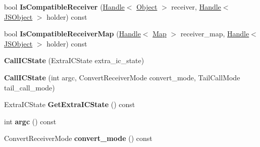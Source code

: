 \begin{DoxyCompactItemize}
\item 
bool {\bfseries Is\+Compatible\+Receiver} (\hyperlink{classv8_1_1internal_1_1_handle}{Handle}$<$ \hyperlink{classv8_1_1internal_1_1_object}{Object} $>$ receiver, \hyperlink{classv8_1_1internal_1_1_handle}{Handle}$<$ \hyperlink{classv8_1_1internal_1_1_j_s_object}{J\+S\+Object} $>$ holder) const \hypertarget{classv8_1_1internal_1_1_b_a_s_e___e_m_b_e_d_d_e_d_a04e22989931ae1087959c22e1a6d11ae}{}\label{classv8_1_1internal_1_1_b_a_s_e___e_m_b_e_d_d_e_d_a04e22989931ae1087959c22e1a6d11ae}

\item 
bool {\bfseries Is\+Compatible\+Receiver\+Map} (\hyperlink{classv8_1_1internal_1_1_handle}{Handle}$<$ \hyperlink{classv8_1_1internal_1_1_map}{Map} $>$ receiver\+\_\+map, \hyperlink{classv8_1_1internal_1_1_handle}{Handle}$<$ \hyperlink{classv8_1_1internal_1_1_j_s_object}{J\+S\+Object} $>$ holder) const \hypertarget{classv8_1_1internal_1_1_b_a_s_e___e_m_b_e_d_d_e_d_af868822b7aad2bef99a9010ce94ece2b}{}\label{classv8_1_1internal_1_1_b_a_s_e___e_m_b_e_d_d_e_d_af868822b7aad2bef99a9010ce94ece2b}

\item 
{\bfseries Call\+I\+C\+State} (Extra\+I\+C\+State extra\+\_\+ic\+\_\+state)\hypertarget{classv8_1_1internal_1_1_b_a_s_e___e_m_b_e_d_d_e_d_ab18d88a084251214dd788fd13f17784b}{}\label{classv8_1_1internal_1_1_b_a_s_e___e_m_b_e_d_d_e_d_ab18d88a084251214dd788fd13f17784b}

\item 
{\bfseries Call\+I\+C\+State} (int argc, Convert\+Receiver\+Mode convert\+\_\+mode, Tail\+Call\+Mode tail\+\_\+call\+\_\+mode)\hypertarget{classv8_1_1internal_1_1_b_a_s_e___e_m_b_e_d_d_e_d_a9e494ea3e8bd54d2c779f185263b1948}{}\label{classv8_1_1internal_1_1_b_a_s_e___e_m_b_e_d_d_e_d_a9e494ea3e8bd54d2c779f185263b1948}

\item 
Extra\+I\+C\+State {\bfseries Get\+Extra\+I\+C\+State} () const \hypertarget{classv8_1_1internal_1_1_b_a_s_e___e_m_b_e_d_d_e_d_af7260d1f010f4e6a7e3f6384dc5cd5ca}{}\label{classv8_1_1internal_1_1_b_a_s_e___e_m_b_e_d_d_e_d_af7260d1f010f4e6a7e3f6384dc5cd5ca}

\item 
int {\bfseries argc} () const \hypertarget{classv8_1_1internal_1_1_b_a_s_e___e_m_b_e_d_d_e_d_a9cdcaa98a0ef9221a74ca2563e6b458f}{}\label{classv8_1_1internal_1_1_b_a_s_e___e_m_b_e_d_d_e_d_a9cdcaa98a0ef9221a74ca2563e6b458f}

\item 
Convert\+Receiver\+Mode {\bfseries convert\+\_\+mode} () const \hypertarget{classv8_1_1internal_1_1_b_a_s_e___e_m_b_e_d_d_e_d_aceac3abd0f484cdf163f1420a471c952}{}\label{classv8_1_1internal_1_1_b_a_s_e___e_m_b_e_d_d_e_d_aceac3abd0f484cdf163f1420a471c952}


\end{DoxyCompactItemize}

